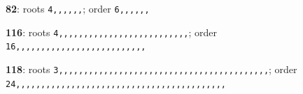 \noindent \textbf{82}: roots \texttt{4,,,,,,}; order \texttt{6,,,,,,}\par
\noindent \textbf{116}: roots \texttt{4,,,,,,,,,,,,,,,,,,,,,,,,,,}; order \texttt{16,,,,,,,,,,,,,,,,,,,,,,,,,,}\par
\noindent \textbf{118}: roots \texttt{3,,,,,,,,,,,,,,,,,,,,,,,,,,,,,,,,,,,,,,,,,,}; order \texttt{24,,,,,,,,,,,,,,,,,,,,,,,,,,,,,,,,,,,,,,,,,,}\par
